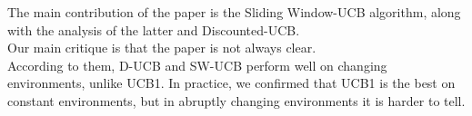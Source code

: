 The main contribution of the paper is the Sliding Window-UCB algorithm, along with the analysis of the latter and Discounted-UCB.\\

Our main critique is that the paper is not always clear.\\
According to them, D-UCB and SW-UCB perform well on changing environments, unlike UCB1. In practice, we confirmed that UCB1 is the best on constant environments, but in abruptly changing environments it is harder to tell.